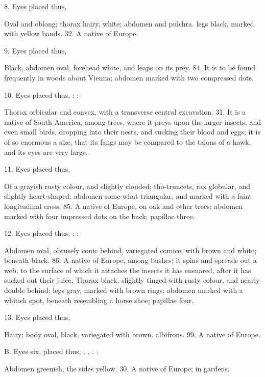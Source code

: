 \documentclass{article}
\begin{document}
8. Eyes placed thus,

Oval and oblong; thorax hairy, white; abdomen and pulchra. legs black, marked with yellow bands. 32. A native of Europe.

9. Eyes placed thus,

Black, abdomen oval, forehead white, and leaps on its prey. 84. It is to be found frequently in woods about Vienna; abdomen marked with two compressed dots.

10. Eyes placed thus, : :

Thorax orbicular and convex, with a transverse central excavation. 31. It is a native of South America, among trees, where it preys upon the larger insects, and even small birds, dropping into their nests, and sucking their blood and eggs; it is of so enormous a size, that its fangs may be compared to the talons of a hawk, and its eyes are very large.

11. Eyes placed thus,

Of a grayish rusty colour, and slightly clouded; tho-truncets, rax globular, and slightly heart-shaped; abdomen some-what triangular, and marked with a faint longitudinal cross. 85. A native of Europe, on oak and other trees; abdomen marked with four impressed dots on the back; papillae three.

12. Eyes placed thus, : :

Abdomen oval, obtusely conic behind, variegated comice. with brown and white; beneath black. 86. A native of Europe, among bushes; it spins and spreads out a web, to the surface of which it attaches the insects it has ensnared, after it has sucked out their juice. Thorax black, slightly tinged with rusty colour, and nearly double behind; legs gray, marked with brown rings; abdomen marked with a whitish spot, beneath resembling a horse shoe; papillae four.

13. Eyes placed thus,

Hairy; body oval, black, variegated with brown. albifrons.
99. A native of Europe.

B. Eyes six, placed thus, . . . .

Abdomen greenish, the sides yellow. 30. A native of Europe; in gardens.
\end{document}
